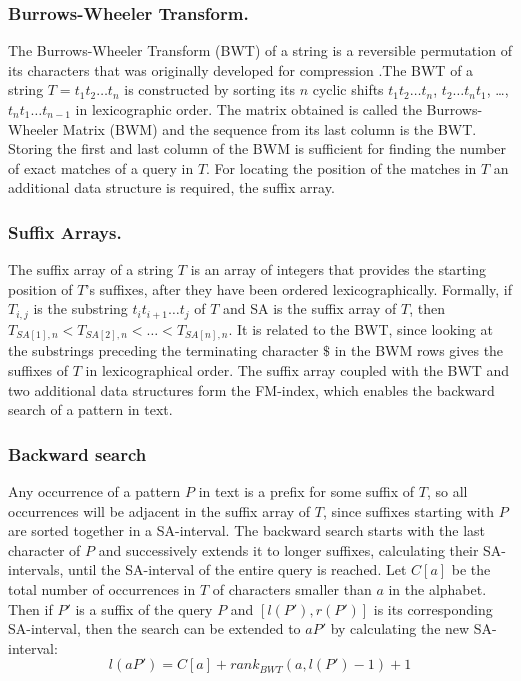 \documentclass[runningheads,a4paper]{llncs}
\begin{document}
\subsubsection{Burrows-Wheeler Transform.}
The Burrows-Wheeler Transform (BWT) of a string is a reversible permutation of its characters that was originally developed for compression \cite{bwt}.The BWT of a string $T=t_1t_2 \ldots t_n$ is constructed by sorting its $n$ cyclic shifts $t_1t_2 \ldots t_n$, $t_2 \ldots t_n t_1$, \ldots,  $t_n t_1 \ldots t_{n-1}$ in lexicographic order. The matrix obtained is called the Burrows-Wheeler Matrix (BWM) and the sequence from its last column is the BWT. Storing the first and last column of the BWM is sufficient for finding the number of exact matches of a query in $T$. For locating the position of the matches in $T$ an additional data structure is required, the suffix array. 

\subsubsection{Suffix Arrays.} The suffix array of a string $T$ is an array of integers that provides the starting position of $T$'s suffixes, after they have been ordered lexicographically. Formally, if $T_{i,j}$ is the substring $t_i t_{i+1} \ldots t_j$ of $T$ and SA is the suffix array of $T$, then $T_{SA[1],n}<T_{SA[2],n}<\ldots <T_{SA[n],n}$. It is related to the BWT, since looking at the substrings preceding the terminating character $\$$ in the BWM rows gives the suffixes of $T$ in lexicographical order. The suffix array coupled with the BWT and two additional data structures form the FM-index, which enables the backward search of a pattern in text.

\subsubsection{Backward search}
Any occurrence of a pattern $P$ in text is a prefix for some suffix of $T$, so all occurrences will be adjacent in the suffix array of $T$, since suffixes starting with $P$ are sorted together in a SA-interval. The backward search starts with the last character of $P$ and successively extends it to longer suffixes, calculating their SA-intervals, until the SA-interval of the entire query is reached. Let $C[a]$ be the total number of occurrences in $T$ of characters smaller than $a$ in the alphabet. Then if $P'$ is a suffix of the query $P$ and $[l(P'),r(P')]$ is its corresponding SA-interval, then the search can be extended to $aP'$ by calculating the new SA-interval:
\newline
\begin{equation} 
l(aP')=C[a]+rank_{BWT}(a,l(P')-1)+1 
\end{equation} 
\end{document}
